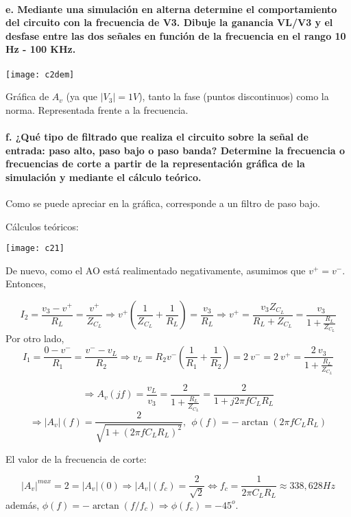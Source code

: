 \documentclass{article}
\begin{document}
\paragraph{e. Mediante una simulación en alterna determine el comportamiento del circuito con la
frecuencia de V3. Dibuje la ganancia VL/V3 y el desfase entre las dos señales en función de la
frecuencia en el rango 10 Hz - 100 KHz.\\}

\begin{center}
\centerline{\texttt{[image: c2dem]}}

Gráfica de $A_v$ (ya que $|V_3|=1V$), tanto la fase (puntos discontinuos) como la norma. Representada frente a la frecuencia.
\end{center}

\paragraph{f. ¿Qué tipo de filtrado que realiza el circuito sobre la señal de entrada: paso alto, paso bajo o
paso banda? Determine la frecuencia o frecuencias de corte a partir de la representación gráfica
de la simulación y mediante el cálculo teórico.\\}
Como se puede apreciar en la gráfica, corresponde a un filtro de paso bajo.

\cleardoublepage

Cálculos teóricos:

\centerline{\texttt{[image: c21]}}

De nuevo, como el AO está realimentado negativamente, asumimos que $v^+=v^-$. Entonces, 

$$I_2=\frac{v_3-v^+}{R_L}=\frac{v^+}{Z_{C_L}}\Rightarrow v^+\left(\frac{1}{Z_{C_L}}+\frac{1}{R_L}\right)=\frac{v_3}{R_L}\Rightarrow v^+=\frac{v_3 Z_{C_L}}{R_L+Z_{C_L}}=\frac{v_3}{1+\frac{R_L}{ Z_{C_L}}}$$
Por otro lado,
$$I_1=\frac{0-v^-}{R_1}=\frac{v^--v_{L}}{R_2}\Rightarrow v_L=R_2 v^- \left( \frac{1}{R_1}+\frac{1}{R_2}\right)=2\ v^-= 2\ v^+ = \frac{2\ v_3}{1+\frac{R_L}{ Z_{C_L}}}$$

$$\Rightarrow A_v(jf)=\frac{v_L}{v_3}=\frac{2}{1+\frac{R_L}{ Z_{C_L}}}=\frac{2}{1+j2\pi f C_L R_L}$$ $$\Rightarrow |A_v|(f) = \frac{2}{\sqrt{1+(2\pi f C_L R_L)^2}}, \ \ \phi (f)=-\arctan{(2\pi f C_L R_L)}$$

El valor de la frecuencia de corte:

$$|A_v|^{max}=2=|A_v|(0)\Rightarrow |A_v|(f_c)=\frac{2}{\sqrt2}\iff f_c=\frac{1}{2\pi C_L R_L}\approx 338,628 Hz$$
además, $\phi(f)=-\arctan{(f/f_c)}\Rightarrow \phi(f_c)=-45^o$.
\end{document}
